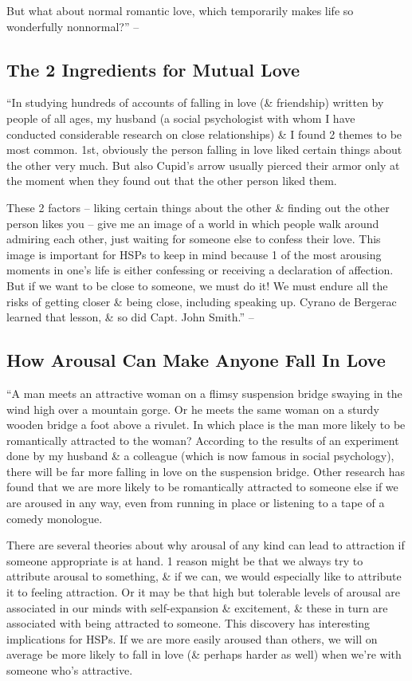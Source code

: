 \documentclass{article}
\numberwithin{equation}{section}
\begin{document}
But what about normal romantic love, which temporarily makes life so wonderfully nonnormal?'' -- \cite[pp. 174--176]{Aron2013}

\subsection{The 2 Ingredients for Mutual Love}
``In studying hundreds of accounts of falling in love (\& friendship) written by people of all ages, my husband (a social psychologist with whom I have conducted considerable research on close relationships) \& I found 2 themes to be most common. 1st, obviously the person falling in love liked certain things about the other very much. But also Cupid's arrow usually pierced their armor only at the moment when they found out that the other person liked them.

These 2 factors -- liking certain things about the other \& finding out the other person likes you -- give me an image of a world in which people walk around admiring each other, just waiting for someone else to confess their love. This image is important for HSPs to keep in mind because 1 of the most arousing moments in one's life is either confessing or receiving a declaration of affection. But if we want to be close to someone, we must do it! We must endure all the risks of getting closer \& being close, including speaking up. Cyrano de Bergerac learned that lesson, \& so did Capt. John Smith.'' -- \cite[p. 177]{Aron2013}

\subsection{How Arousal Can Make Anyone Fall In Love}
``A man meets an attractive woman on a flimsy suspension bridge swaying in the wind high over a mountain gorge. Or he meets the same woman on a sturdy wooden bridge a foot above a rivulet. In which place is the man more likely to be romantically attracted to the woman? According to the results of an experiment done by my husband \& a colleague (which is now famous in social psychology), there will be far more falling in love on the suspension bridge. Other research has found that we are more likely to be romantically attracted to someone else if we are aroused in any way, even from running in place or listening to a tape of a comedy monologue.

There are several theories about why arousal of any kind can lead to attraction if someone appropriate is at hand. 1 reason might be that we always try to attribute arousal to something, \& if we can, we would especially like to attribute it to feeling attraction. Or it may be that high but tolerable levels of arousal are associated in our minds with self-expansion \& excitement, \& these in turn are associated with being attracted to someone. This discovery has interesting implications for HSPs. If we are more easily aroused than others, we will on average be more likely to fall in love (\& perhaps harder as well) when we're with someone who's attractive.
\end{document}
